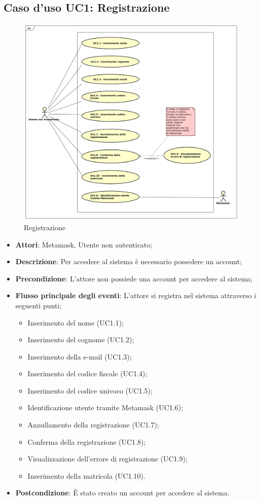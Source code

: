 \subsection{Caso d'uso \texorpdfstring{UC1}{UC1}: Registrazione }
\begin{figure} [H]
	\centering
	\includegraphics[scale=0.45]{./img/UC1.pdf}
	\caption{Registrazione }\label{}
\end{figure}
\begin{itemize}
	\item \textbf{Attori}: Metamask, Utente non autenticato;
	\item \textbf{Descrizione}: Per accedere al sistema è necessario possedere un account;
	\item \textbf{Precondizione}: L'attore non possiede una account per accedere al sistema;
	\item \textbf{Flusso principale degli eventi}: L'attore si registra nel sistema attraverso i seguenti punti;
	\begin{itemize}
		\item Inserimento del nome (UC1.1);
		\item Inserimento del cognome (UC1.2);
		\item Inserimento della e-mail (UC1.3);
		\item Inserimento del codice fiscale (UC1.4);
		\item Inserimento del codice univoco (UC1.5);
		\item Identificazione utente tramite Metamask (UC1.6);
		\item Annullamento della registrazione (UC1.7);
		\item Conferma della registrazione (UC1.8);
		\item Visualizzazione dell'errore di registrazione (UC1.9);
		\item Inserimento della matricola (UC1.10).
	\end{itemize}
	\item \textbf{Postcondizione}: È stato creato un account per accedere al sistema.
\end{itemize}
